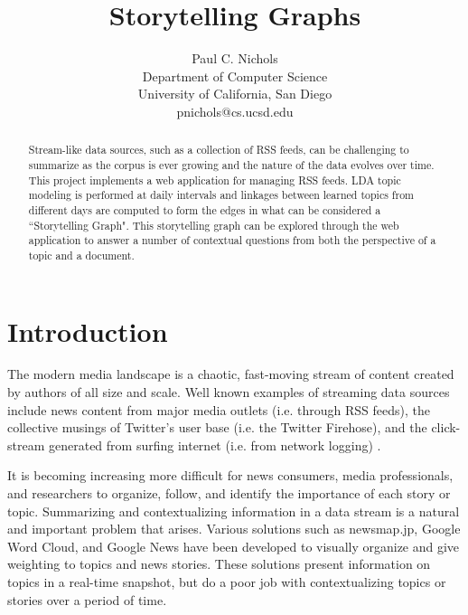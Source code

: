 \documentclass[10pt]{article}
\begin{document}
\newcommand{\argmin}{\operatornamewithlimits{argmin}}
\title{Storytelling Graphs}
\author{
    Paul C. Nichols\\
    Department of Computer Science\\
    University of California, San Diego\\
    pnichols@cs.ucsd.edu
}
\date{}
\maketitle


\begin{abstract}
Stream-like data sources, such as a collection of RSS feeds, can be challenging to summarize as the corpus is ever growing and the nature of the data evolves over time.  This project implements a web application for managing RSS feeds.  LDA topic modeling is performed at daily intervals and linkages between learned topics from different days are computed to form the edges in what can be considered a ``Storytelling Graph".  This storytelling graph can be explored through the web application  to answer a number of contextual questions from both the perspective of a topic and a document.  
\end{abstract}

\section{Introduction}
The modern media landscape is a chaotic, fast-moving stream of content created by authors of all size and scale. Well known examples of streaming data sources include news content from major media outlets (i.e. through RSS feeds), the collective musings of Twitter's user base  (i.e. the Twitter Firehose), and the click-stream generated from surfing internet (i.e. from network logging) .

It is becoming increasing more difficult for news consumers, media professionals, and researchers to organize, follow, and identify the importance of each story or topic. Summarizing and contextualizing information in a data stream is a natural and important problem that arises. Various solutions such as newsmap.jp, Google Word Cloud, and Google News have been developed to visually organize and give weighting to topics and news stories. These solutions present information on topics in a real-time snapshot, but do a poor job with contextualizing topics or stories over a period of time. 
\end{document}
